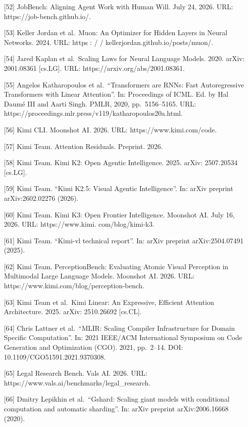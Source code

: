 \documentclass[
  10
]{article}
\begin{document}
{[}52{]} JobBench: Aligning Agent Work with Human Will. July 24, 2026.
URL: https://job-bench.github.io/.

{[}53{]} Keller Jordan et al.~Muon: An Optimizer for Hidden Layers in
Neural Networks. 2024. URL: https : / /
kellerjordan.github.io/posts/muon/.

{[}54{]} Jared Kaplan et al.~Scaling Laws for Neural Language Models.
2020. arXiv: 2001.08361 {[}cs.LG{]}. URL:
https://arxiv.org/abs/2001.08361.

{[}55{]} Angelos Katharopoulos et al.~``Transformers are RNNs: Fast
Autoregressive Transformers with Linear Attention''. In: Proceedings of
ICML. Ed. by Hal Daumé III and Aarti Singh. PMLR, 2020, pp.~5156--5165.
URL: https://proceedings.mlr.press/v119/katharopoulos20a.html.

{[}56{]} Kimi CLI. Moonshot AI. 2026. URL: https://www.kimi.com/code.

{[}57{]} Kimi Team. Attention Residuals. Preprint. 2026.

{[}58{]} Kimi Team. Kimi K2: Open Agentic Intelligence. 2025. arXiv:
2507.20534 {[}cs.LG{]}.

{[}59{]} Kimi Team. ``Kimi K2.5: Visual Agentic Intelligence''. In:
arXiv preprint arXiv:2602.02276 (2026).

{[}60{]} Kimi Team. Kimi K3: Open Frontier Intelligence. Moonshot AI.
July 16, 2026. URL: https://www.kimi. com/blog/kimi-k3.

{[}61{]} Kimi Team. ``Kimi-vl technical report''. In: arXiv preprint
arXiv:2504.07491 (2025).

{[}62{]} Kimi Team. PerceptionBench: Evaluating Atomic Visual Perception
in Multimodal Large Language Models. Moonshot AI. 2026. URL:
https://www.kimi.com/blog/perception-bench.

{[}63{]} Kimi Team et al.~Kimi Linear: An Expressive, Efficient
Attention Architecture. 2025. arXiv: 2510.26692 {[}cs.CL{]}.

{[}64{]} Chris Lattner et al.~``MLIR: Scaling Compiler Infrastructure
for Domain Specific Computation''. In: 2021 IEEE/ACM International
Symposium on Code Generation and Optimization (CGO). 2021, pp.~2--14.
DOI: 10.1109/CGO51591.2021.9370308.

{[}65{]} Legal Research Bench. Vals AI. 2026. URL:
https://www.vals.ai/benchmarks/legal\_research.

{[}66{]} Dmitry Lepikhin et al.~``Gshard: Scaling giant models with
conditional computation and automatic sharding''. In: arXiv preprint
arXiv:2006.16668 (2020).
\end{document}
